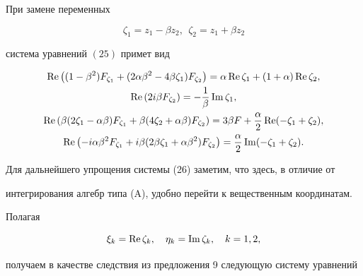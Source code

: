 \begin{prop}


При замене переменных


$$ 


 \zeta_1 = z_1 - \beta z_2, \ \ 


 \zeta_2 = z_1 + \beta z_2


$$


система уравнений $(25)$ примет вид


\begin{gather}


 \re \left( ( 1- \beta^2) 


F_{\zeta_1} + ( 2 \alpha \beta^2 - 4 \beta \zeta_1 ) 


F_{\zeta_2} \right)= 


\alpha \re \zeta_1 + (1 + \alpha) \re \zeta_2, \notag \\


 \re \left( 2 i \beta 


F_{\zeta_2 } \right)= - \frac 1{\beta} \im \zeta_1, \\


 \re \left( \beta ( 2 \zeta_1- \alpha \beta ) 


F_{\zeta_1} + \beta ( 4 \zeta_2 + \alpha \beta ) F_{\zeta_2} 


\right)= 3 \beta F + \frac{\alpha}2 \re (- \zeta_1 + \zeta_2 ),\notag\\


 \re \left( - i \alpha \beta^2


F_{\zeta_1} +  i \beta ( 2 \beta \zeta_1 + \alpha \beta^2 ) 


F_{\zeta_2} \right)= 


\frac{\alpha}2 \im (- \zeta_1 + \zeta_2 ).\notag


\end{gather}


\end{prop}





Для дальнейшего упрощения системы (26) заметим, что здесь, в отличие от


интегрирования алгебр типа (A), удобно перейти к вещественным координатам.


Полагая 


$$


\xi_k = \re \zeta_k, \quad \eta_k = \im \zeta_k, \quad k = 1,2,


$$


получаем в качестве следствия из предложения 9 следующую систему уравнений 


